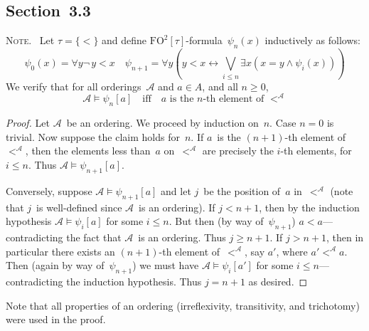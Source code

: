 \documentclass[letterpaper]{article}
\newcommand{\A}{\mathcal{A}}
\newcommand{\fo}{\mathrm{FO}}
\newcommand{\liff}{\leftrightarrow}
\newcommand{\biglor}{\bigvee}
\newcommand{\booksection}[1]{\subsection*{Section~{#1}}}
\newcommand{\note}{\noindent\textsc{Note.}\ }
\theoremstyle{plain}
\begin{document}
\booksection{3.3}
\note
Let $\tau=\{<\}$ and define $\fo^2[\tau]$-formula~$\psi_n(x)$ inductively as follows:
$$\psi_0(x)=\forall y\lnot\,y<x\quad\psi_{n+1}=\forall y(y<x\liff\biglor_{i\le n}\exists x(x=y\land\psi_i(x)))$$
We verify that for all orderings~$\A$ and $a\in A$, and all $n\ge0$,
$$\A\models\psi_n[a]\quad\text{iff}\quad\text{$a$ is the $n$-th element of~$<^{\A}$}$$
\begin{proof}
Let $\A$~be an ordering. We proceed by induction on~$n$. Case $n=0$ is trivial. Now suppose the claim holds for~$n$. If $a$~is the $(n+1)$-th element of~$<^{\A}$, then the elements less than~$a$ on~$<^{\A}$ are precisely the $i$-th elements, for $i\le n$. Thus $\A\models\psi_{n+1}[a]$.

Conversely, suppose $\A\models\psi_{n+1}[a]$ and let $j$~be the position of~$a$ in~$<^{\A}$ (note that $j$~is well-defined since $\A$~is an ordering). If $j<n+1$, then by the induction hypothesis $\A\models\psi_i[a]$ for some $i\le n$. But then (by way of~$\psi_{n+1}$) $a<a$---contradicting the fact that $\A$~is an ordering. Thus $j\ge n+1$. If $j>n+1$, then in particular there exists an $(n+1)$-th element of~$<^{\A}$, say $a'$, where $a'<^{\A}a$. Then (again by way of~$\psi_{n+1}$) we must have $\A\models\psi_i[a']$ for some $i\le n$---contradicting the induction hypothesis. Thus $j=n+1$ as desired.
\end{proof}
\noindent Note that all properties of an ordering (irreflexivity, transitivity, and trichotomy) were used in the proof.
\end{document}
